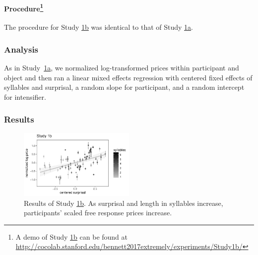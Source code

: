 \documentclass[10pt,letterpaper]{article}
\begin{document}
\paragraph{Procedure\footnote{A demo of Study \hyperref[sec:study1b]{1b} can be found at \url{http://cocolab.stanford.edu/bennett2017extremely/experiments/Study1b/}}}

The procedure for Study \hyperref[sec:study1b]{1b} was identical to that of Study \hyperref[sec:study1a]{1a}.


\subsubsection{Analysis}

As in Study~\hyperref[sec:study1a]{1a}, we normalized log-transformed prices within participant and object and then ran a linear mixed effects regression with centered fixed effects of syllables and surprisal, a random slope for participant, and a random intercept for intensifier.

\subsubsection{Results}



\begin{figure}[ht]
\begin{center}
\includegraphics[width=0.5\textwidth]{images/plot_study1b.pdf}
\end{center}
\caption{Results of Study \hyperref[sec:study1b]{1b}. As surprisal and length in syllables increase, participants' scaled free response prices increase.} 
\label{fig:plot_study1b}
\end{figure}
\end{document}

